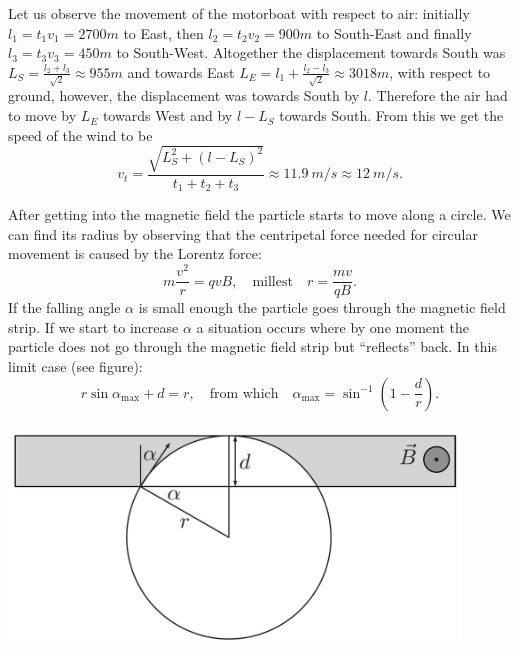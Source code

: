 \documentclass[11pt]{article}
\begin{document}
\solueng
Let us observe the movement of the motorboat with respect to air: initially $l_1=t_1v_1=\SI{2700}m$ to East, then $l_2=t_2v_2=\SI{900}m$ to South-East and finally $l_3=t_3v_3=\SI{450}m$ to South-West. Altogether the displacement towards South was $L_S=\frac{l_2+l_3}{\sqrt 2}\approx \SI{955}m$ and towards East $L_E=l_1+\frac{l_2-l_3}{\sqrt 2}\approx \SI{3018}m$, with respect to ground, however, the displacement was towards South by $l$. Therefore the air had to move by $L_E$ towards West and by $l-L_S$ towards South. From this we get the speed of the wind to be
$$v_t=\frac{\sqrt{L_S^2+(l-L_S)^2}}{t_1+t_2+t_3}\approx \SI{11.9}{m/s}\approx \SI{12}{m/s}.$$
\probend
\bigskip


\solueng
After getting into the magnetic field the particle starts to move along a circle. We can find its radius by observing that the centripetal force needed for circular movement is caused by the Lorentz force:
\[m\frac{v^2}{r}=qvB, \quad \text{millest} \quad r=\frac{mv}{qB}.\]
If the falling angle $\alpha$ is small enough the particle goes through the magnetic field strip. If we start to increase $\alpha$ a situation occurs where by one moment the particle does not go through the magnetic field strip but “reflects” back. In this limit case (see figure):
\[r\sin\alpha_\text{max}+d=r, \quad \text{from which} \quad \alpha_\text{max}=\sin^{-1}\left(1-\frac{d}{r}\right).\]
\begin{center}
\includegraphics[width=0.9\textwidth]{2013-lahg-02-magPeegLah}
\end{center}
\probend
\bigskip

\end{document}
